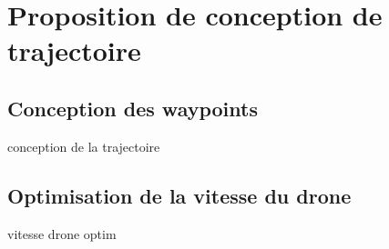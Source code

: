 \section{Proposition de conception de trajectoire}

\subsection{Conception des waypoints}
\begin{frame}{}
conception de la trajectoire
\end{frame}

\subsection{Optimisation de la vitesse du drone}

\begin{frame}{}
vitesse drone optim
\end{frame}
